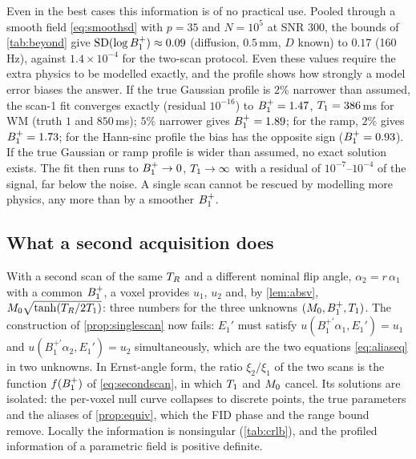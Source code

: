 Even in the best cases this information is of no practical use. Pooled through a smooth
field \eqref{eq:smoothsd} with $p=35$ and $N=10^5$ at SNR 300, the bounds of \cref{tab:beyond} give
$\mathrm{SD}(\log B_1^{+})\approx0.09$ (diffusion, $0.5$\,mm, $D$ known) to $0.17$ (160\,Hz), against $1.4\times10^{-4}$ for
the two-scan protocol. Even these values require the extra physics to be modelled exactly,
and the profile shows how strongly a model error biases the answer. If the true Gaussian
profile is $2\%$ narrower than assumed, the scan-1 fit converges exactly (residual $10^{-16}$) to
$B_1^{+}=1.47$, $T_1=386$\,ms for WM (truth $1$ and $850$\,ms); $5\%$ narrower gives $B_1^{+}=1.89$; for the ramp,
$2\%$ gives $B_1^{+}=1.73$; for the Hann-sinc profile the bias has the opposite sign ($B_1^{+}=0.93$). If the
true Gaussian or ramp profile is wider than assumed, no exact solution exists. The fit then
runs to $B_1^{+}\to0$, $T_1\to\infty$ with a residual of $10^{-7}$--$10^{-4}$ of the signal, far below the noise. A single scan cannot be rescued by modelling more physics, any more than by a
smoother $B_1^{+}$.

\subsection{What a second acquisition does}

With a second scan of the same $T_R$ and a different nominal flip angle, $\alpha_2=r\,\alpha_1$ with a
common $B_1^{+}$, a voxel provides $u_1$, $u_2$ and, by \cref{lem:absv}, $M_0\sqrt{\tanh(T_R/2T_1)}$: three numbers
for the three unknowns $(M_0,B_1^{+},T_1)$. The construction of \cref{prop:singlescan} now fails:
$E_1'$ must satisfy $u(B_1^{+\prime}\alpha_1,E_1')=u_1$ and $u(B_1^{+\prime}\alpha_2,E_1')=u_2$ simultaneously, which are the two
equations \eqref{eq:aliaseq} in two unknowns. In Ernst-angle form, the ratio $\xi_2/\xi_1$ of the two scans
is the function $f(B_1^{+})$ of \eqref{eq:secondscan}, in which $T_1$ and $M_0$ cancel. Its solutions are isolated: the per-voxel null
curve collapses to discrete points, the true parameters and the aliases of
\cref{prop:equiv}, which the FID phase and the range bound remove. Locally the information
is nonsingular (\cref{tab:crlb}), and the profiled information of a parametric field is
positive definite.

